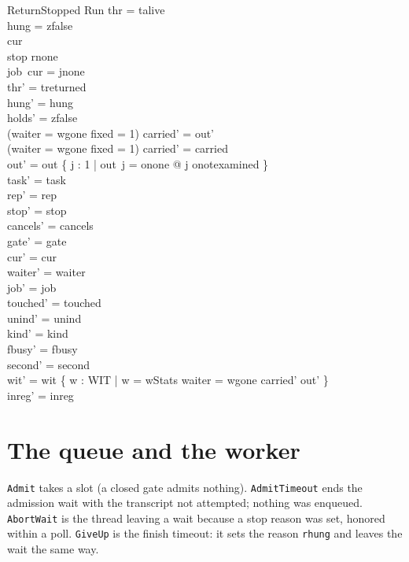\documentclass[a4paper,10pt,fleqn]{article}
\newcommand{\field}[1]{\texttt{#1}}
\begin{document}
\begin{schema}{ReturnStopped}
\Delta Run
\where
thr = talive \\
hung = zfalse \\
cur   \\
stop \neq rnone \\
job~cur = jnone \\
thr' = treturned \\
hung' = hung \\
holds' = zfalse \\
(waiter = wgone \land fixed = 1) \implies carried' = out' \\
\lnot (waiter = wgone \land fixed = 1) \implies carried' = carried \\
out' = out \oplus \{ j : 1  | out~j = onone @ j \mapsto onotexamined \} \\
task' = task \\
rep' = rep \\
stop' = stop \\
cancels' = cancels \\
gate' = gate \\
cur' = cur \\
waiter' = waiter \\
job' = job \\
touched' = touched \\
unind' = unind \\
kind' = kind \\
fbusy' = fbusy \\
second' = second \\
wit' = wit \cup \{ w : WIT | w = wStats \land waiter = wgone \land carried' \neq out' \} \\
inreg' = inreg
\end{schema}

\section{The queue and the worker}
\label{sec:queue}

\field{Admit} takes a slot (a closed gate admits nothing). \field{AdmitTimeout}
ends the admission wait with the transcript not attempted; nothing was
enqueued. \field{AbortWait} is the thread leaving a wait because a stop reason
was set, honored within a poll. \field{GiveUp} is the finish timeout: it sets
the reason \field{rhung} and leaves the wait the same way.
\end{document}
